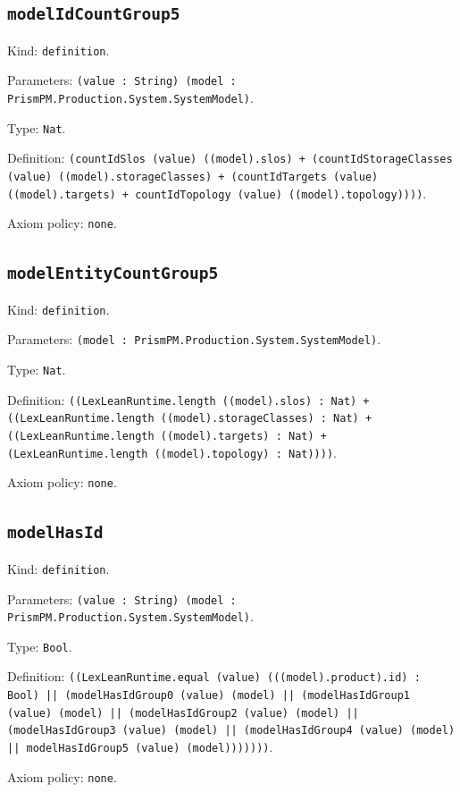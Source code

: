 \documentclass[11pt]{article}
\begin{document}
\subsection*{\texttt{modelIdCountGroup5}}
\noindent Kind: \texttt{definition}.\par
\noindent Parameters: \texttt{(value : String) (model : PrismPM.Production.System.SystemModel)}.\par
\noindent Type: \texttt{Nat}.\par
\noindent Definition: \texttt{(countIdSlos (value) ((model).slos) + (countIdStorageClasses (value) ((model).storageClasses) + (countIdTargets (value) ((model).targets) + countIdTopology (value) ((model).topology))))}.\par
\noindent Axiom policy: \texttt{none}.\par
\subsection*{\texttt{modelEntityCountGroup5}}
\noindent Kind: \texttt{definition}.\par
\noindent Parameters: \texttt{(model : PrismPM.Production.System.SystemModel)}.\par
\noindent Type: \texttt{Nat}.\par
\noindent Definition: \texttt{((LexLeanRuntime.length ((model).slos) : Nat) + ((LexLeanRuntime.length ((model).storageClasses) : Nat) + ((LexLeanRuntime.length ((model).targets) : Nat) + (LexLeanRuntime.length ((model).topology) : Nat))))}.\par
\noindent Axiom policy: \texttt{none}.\par
\subsection*{\texttt{modelHasId}}
\noindent Kind: \texttt{definition}.\par
\noindent Parameters: \texttt{(value : String) (model : PrismPM.Production.System.SystemModel)}.\par
\noindent Type: \texttt{Bool}.\par
\noindent Definition: \texttt{((LexLeanRuntime.equal (value) (((model).product).id) : Bool) || (modelHasIdGroup0 (value) (model) || (modelHasIdGroup1 (value) (model) || (modelHasIdGroup2 (value) (model) || (modelHasIdGroup3 (value) (model) || (modelHasIdGroup4 (value) (model) || modelHasIdGroup5 (value) (model)))))))}.\par
\noindent Axiom policy: \texttt{none}.\par
\end{document}
